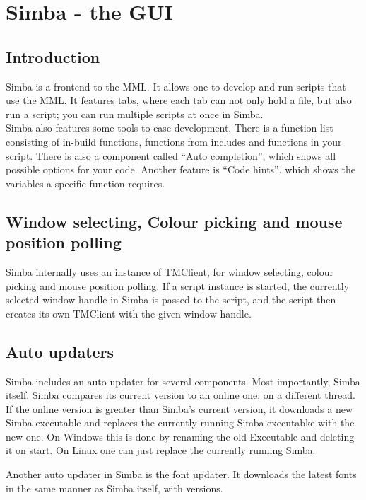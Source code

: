 \documentclass[a4paper, 10pt]{report} %
\begin{document}
\chapter{Simba - the GUI}

\section{Introduction}

Simba is a frontend to the MML. It allows one to develop and run scripts that 
use the MML. It features tabs, where each tab can not only hold a file, but also
run a script; you can run multiple scripts at once in Simba. \\

Simba also features some tools to ease development. There is a function list
consisting of in-build functions, functions from includes and functions in your
script. There is also a component called ``Auto completion'', which shows all
possible options for your code. Another feature is ``Code hints'', which shows
the variables a specific function requires.

\section{Window selecting, Colour picking and mouse position polling}
Simba internally uses an instance of TMClient, for window selecting, colour
picking and mouse position polling. If a script instance is started, the
currently selected window handle in Simba is passed to the script, and the script
then creates its own TMClient with the given window handle.

\section{Auto updaters}

Simba includes an auto updater for several components. Most importantly, Simba
itself. Simba compares its current version to an online one; on a different
thread. If the online version is greater than Simba's current version, it
downloads a new Simba executable and replaces the currently running Simba
executabke with the new one. On Windows this is done by renaming the old
Executable and deleting it on start. On Linux one can just replace the currently
running Simba.

Another auto updater in Simba is the font updater. It downloads the latest fonts
in the same manner as Simba itself, with versions.
\end{document}
